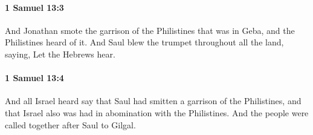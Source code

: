 		\paragraph{1 Samuel 13:3} %
			\label{1SAMUEL-13-3}

			And Jonathan smote the garrison of the Philistines that was in Geba, and the Philistines heard of it. And Saul blew the trumpet throughout all the land, saying, Let the Hebrews hear.


		\paragraph{1 Samuel 13:4} %
			\label{1SAMUEL-13-4}

			And all Israel heard say that Saul had smitten a garrison of the Philistines, and that Israel also was had in abomination with the Philistines. And the people were called together after Saul to Gilgal.

